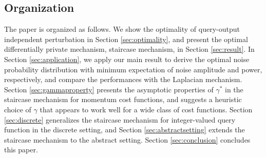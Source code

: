 \subsection{Organization}

The paper is organized as follows. We show the optimality of query-output independent perturbation in Section \ref{sec:optimality}, and present the optimal differentially private mechanism, staircase mechanism, in Section \ref{sec:result}. In Section \ref{sec:application}, we apply our main result to derive the optimal noise probability distribution with minimum expectation of noise amplitude and power, respectively, and  compare the performances with the Laplacian mechanism.  Section \ref{sec:gammaproperty} presents the asymptotic properties of $\gamma^*$ in the staircase mechanism for momentum cost functions, and suggests a heuristic choice of $\gamma$ that appears to work well for a wide class of cost functions. Section \ref{sec:discrete} generalizes the staircase mechanism for integer-valued query function in the discrete setting, and Section \ref{sec:abstractsetting} extends the staircase mechanism to the abstract setting. Section \ref{sec:conclusion} concludes this paper.





